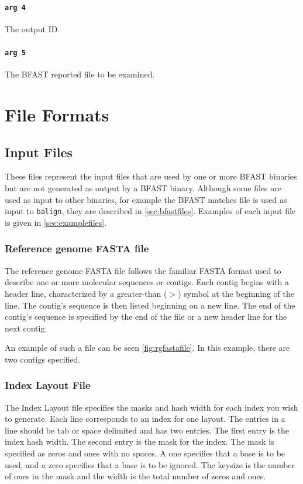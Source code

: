 \documentclass[a4paper,12pt]{book}
\newcommand{\TT}[1]{{\tt #1}} %
\newcommand{\rGFF}{reference genome FASTA file}
\newcommand{\RGFF}{Reference genome FASTA file}
\newcommand{\BMF}{BFAST matches file} %
\newcommand{\BRF}{BFAST reported file} %
\begin{document}
\subsubsection{\TT{arg 4}}
The output ID.
\subsubsection{\TT{arg 5}}
The \BRF{} to be examined.
\chapter{File Formats}
\section{Input Files}
\label{sec:inputfiles}
These files represent the input files that are used by one or more BFAST binaries but are not generated as output by a BFAST binary.
Although some files are used as input to other binaries, for example the \BMF{} is used as input to \TT{balign}, they are described in \autoref{sec:bfastfiles}.
Examples of each input file is given in \autoref{sec:examplefiles}.
\subsection{\RGFF{}}
\label{sec:rgfastafile}
The \rGFF{} follows the familiar FASTA format used to describe one or more molecular sequences or contigs.
Each contig begins with a header line, characterized by a greater-than ($>$) symbol at the beginning of the line.
The contig's sequence is then listed beginning on a new line.
The end of the contig's sequence is specified by the end of the file or a new header line for the next contig.

An example of such a file can be seen \autoref{fig:rgfastafile}.
In this example, there are two contigs specified. 

\subsection{Index Layout File}
\label{sec:layoutfile}
The Index Layout file specifies the masks and hash width for each index you wish to generate.
Each line corresponds to an index for one layout.
The entries in a line should be tab or space delimited and has two entries.
The first entry is the index hash width.
The second entry is the mask for the index.
The mask is specified as zeros and ones with no spaces.
A one specifies that a base is to be used, and a zero specifies that a base is to be ignored.
The keysize is the number of ones in the mask and the width is the total number of zeros and ones.
\end{document}

